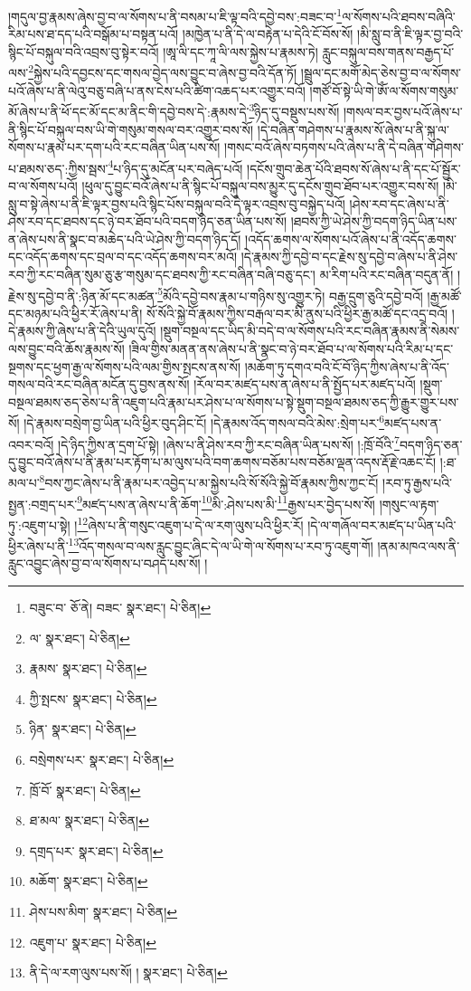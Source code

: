།གདུལ་བྱ་རྣམས་ཞེས་བྱ་བ་ལ་སོགས་པ་ནི་བསམ་པ་ཇི་ལྟ་བའི་དབྱེ་བས་:བཟང་བ་\footnote{བཟུང་བ་  ཅོ་ནེ། བཟང་  སྣར་ཐང་།  པེ་ཅིན། }ལ་སོགས་པའི་ཐབས་བཞིའི་རིམ་པས་ཐ་དད་པའི་བསྒོམ་པ་བསྟན་པའོ། །མཁྱེན་པ་ནི་དེ་ལ་བརྟེན་པ་དེའི་ངོ་བོས་སོ། །མི་སླུ་བ་ནི་ཇི་ལྟར་བྱ་བའི་སྙིང་པོ་བསྐུལ་བའི་འབྲས་བུ་སྟེར་བའོ། །ཨཱ་ལི་དང་ཀཱ་ལི་ལས་སྐྱེས་པ་རྣམས་ཏེ། རླུང་བསྐུལ་བས་གནས་བརྒྱད་པོ་ལས་\footnote{ལ་  སྣར་ཐང་།  པེ་ཅིན། }སྐྱེས་པའི་དབྱངས་དང་གསལ་བྱེད་ལས་བྱུང་བ་ཞེས་བྱ་བའི་དོན་ཏོ། །སྦྲུལ་དང་མགོ་མེད་ཅེས་བྱ་བ་ལ་སོགས་པའོ་ཞེས་པ་ནི་ལེའུ་བཅུ་བཞི་པ་ནས་ངེས་པའི་ཚིག་འཆད་པར་འགྱུར་བའོ། །གཙོ་བོ་སྟེ་ཡི་གེ་ཨོཾ་ལ་སོགས་གསུམ་མོ་ཞེས་པ་ནི་ཕོ་དང་མོ་དང་མ་ནིང་གི་དབྱེ་བས་དེ་:རྣམས་དེ་\footnote{རྣམས་  སྣར་ཐང་།  པེ་ཅིན། }ཉིད་དུ་བསྡུས་པས་སོ། །གསལ་བར་བྱས་པའོ་ཞེས་པ་ནི་སྙིང་པོ་བསྐུལ་བས་ཡི་གེ་གསུམ་གསལ་བར་འགྱུར་བས་སོ། །དེ་བཞིན་གཤེགས་པ་རྣམས་སོ་ཞེས་པ་ནི་སྐུ་ལ་སོགས་པ་རྣམ་པར་དག་པའི་རང་བཞིན་ཡིན་པས་སོ། །གསང་བའོ་ཞེས་བཏགས་པའི་ཞེས་པ་ནི་དེ་བཞིན་གཤེགས་པ་ཐམས་ཅད་:ཀྱིས་སྦས་\footnote{ཀྱི་སྤངས་  སྣར་ཐང་།  པེ་ཅིན། }པ་ཉིད་དུ་མངོན་པར་བཞེད་པའོ། །དངོས་གྲུབ་ཆེན་པོའི་ཐབས་སོ་ཞེས་པ་ནི་དང་པོ་སྦྱོར་བ་ལ་སོགས་པའོ། །ཕུལ་དུ་བྱུང་བའོ་ཞེས་པ་ནི་སྙིང་པོ་བསྐུལ་བས་མྱུར་དུ་དངོས་གྲུབ་ཐོབ་པར་འགྱུར་བས་སོ། །མི་སླུ་བ་སྟེ་ཞེས་པ་ནི་ཇི་ལྟར་བྱས་པའི་སྙིང་པོས་བསྐུལ་བའི་དེ་ལྟར་འབྲས་བུ་བསྐྱེད་པའོ། །ཤེས་རབ་དང་ཞེས་པ་ནི་ཤེས་རབ་དང་ཐབས་དང་ཉེ་བར་ཐོབ་པའི་བདག་ཉིད་ཅན་ཡིན་པས་སོ། །ཐབས་ཀྱི་ཡེ་ཤེས་ཀྱི་བདག་ཉིད་ཡིན་པས་ན་ཞེས་པས་ནི་སྣང་བ་མཆེད་པའི་ཡེ་ཤེས་ཀྱི་བདག་ཉིད་དོ། །འདོད་ཆགས་ལ་སོགས་པའོ་ཞེས་པ་ནི་འདོད་ཆགས་དང་འདོད་ཆགས་དང་བྲལ་བ་དང་འདོད་ཆགས་བར་མའོ། །དེ་རྣམས་ཀྱི་དབྱེ་བ་དང་རྗེས་སུ་དབྱེ་བ་ཞེས་པ་ནི་ཤེས་རབ་ཀྱི་རང་བཞིན་སུམ་ཅུ་རྩ་གསུམ་དང་ཐབས་ཀྱི་རང་བཞིན་བཞི་བཅུ་དང་། མ་རིག་པའི་རང་བཞིན་བདུན་ནོ། །རྗེས་སུ་དབྱེ་བ་ནི་:ཉིན་མོ་དང་མཚན་\footnote{ཉིན་  སྣར་ཐང་།  པེ་ཅིན། }མོའི་དབྱེ་བས་རྣམ་པ་གཉིས་སུ་འགྱུར་ཏེ། བརྒྱ་དྲུག་ཅུའི་དབྱེ་བའོ། །རྒྱ་མཚོ་དང་མཉམ་པའི་ཕྱིར་རོ་ཞེས་པ་ནི། སོ་སོའི་སྐྱེ་བོ་རྣམས་ཀྱིས་བརྒལ་བར་མི་ནུས་པའི་ཕྱིར་རྒྱ་མཚོ་དང་འདྲ་བའོ། །དེ་རྣམས་ཀྱི་ཞེས་པ་ནི་དེའི་ཡུལ་དུའོ། །སྡུག་བསྔལ་དང་ཡིད་མི་བདེ་བ་ལ་སོགས་པའི་རང་བཞིན་རྣམས་ནི་སེམས་ལས་བྱུང་བའི་ཆོས་རྣམས་སོ། །ཟིལ་གྱིས་མནན་ནས་ཞེས་པ་ནི་སྣང་བ་ཉེ་བར་ཐོབ་པ་ལ་སོགས་པའི་རིམ་པ་དང་སྔགས་དང་ཕྱག་རྒྱ་ལ་སོགས་པའི་ལམ་གྱིས་སྤངས་ནས་སོ། །མཆོག་ཏུ་དགའ་བའི་ངོ་བོ་ཉིད་ཀྱིས་ཞེས་པ་ནི་འོད་གསལ་བའི་རང་བཞིན་མངོན་དུ་བྱས་ནས་སོ། །རོལ་བར་མཛད་པས་ན་ཞེས་པ་ནི་སྤྱོད་པར་མཛད་པའོ། །སྡུག་བསྔལ་ཐམས་ཅད་ཅེས་པ་ནི་འཇུག་པའི་རྣམ་པར་ཤེས་པ་ལ་སོགས་པ་སྟེ་སྡུག་བསྔལ་ཐམས་ཅད་ཀྱི་རྒྱུར་གྱུར་པས་སོ། །དེ་རྣམས་བསྲེག་བྱ་ཡིན་པའི་ཕྱིར་བུད་ཤིང་ངོ། །དེ་རྣམས་འོད་གསལ་བའི་མེས་:སྲེག་པར་\footnote{བསྲེགས་པར་  སྣར་ཐང་།  པེ་ཅིན། }མཛད་པས་ན་འབར་བའོ། །དེ་ཉིད་ཀྱིས་ན་དྲག་པོ་སྟེ། །ཞེས་པ་ནི་ཤེས་རབ་ཀྱི་རང་བཞིན་ཡིན་པས་སོ། །:ཁྲོ་བོའི་\footnote{ཁྲོ་བོ་  སྣར་ཐང་།  པེ་ཅིན། }བདག་ཉིད་ཅན་དུ་བྱུང་བའོ་ཞེས་པ་ནི་རྣམ་པར་རྟོག་པ་མ་ལུས་པའི་བག་ཆགས་བཅོམ་པས་བཅོམ་ལྡན་འདས་རྡོ་རྗེ་འཆང་ངོ། །:ཐ་མལ་པ་\footnote{ཐ་མལ་  སྣར་ཐང་།  པེ་ཅིན། }བས་ཀྱང་ཞེས་པ་ནི་རྣམ་པར་འབྱེད་པ་མ་སྐྱེས་པའི་སོ་སོའི་སྐྱེ་བོ་རྣམས་ཀྱིས་ཀྱང་ངོ། །རབ་ཏུ་རྒྱས་པའི་སྤྱན་:བགྲད་པར་\footnote{དགྲད་པར་  སྣར་ཐང་།  པེ་ཅིན། }མཛད་པས་ན་ཞེས་པ་ནི་ཆོག་\footnote{མཆོག་  སྣར་ཐང་།  པེ་ཅིན། }མི་:ཤེས་པས་མི་\footnote{ཤེས་པས་མིག་  སྣར་ཐང་།  པེ་ཅིན། }རྒྱས་པར་བྱེད་པས་སོ། །གསུང་ལ་རྟག་ཏུ་:འཇུག་པ་སྟེ། །\footnote{འཇུག་པ་  སྣར་ཐང་།  པེ་ཅིན། }ཞེས་པ་ནི་གསུང་འཇུག་པ་དེ་ལ་རག་ལུས་པའི་ཕྱིར་རོ། །དེ་ལ་གཞོལ་བར་མཛད་པ་ཡིན་པའི་ཕྱིར་ཞེས་པ་ནི་\footnote{ནི་དེ་ལ་རག་ལུས་པས་སོ། །  སྣར་ཐང་།  པེ་ཅིན། }འོད་གསལ་བ་ལས་རླུང་བྱུང་ཞིང་དེ་ལ་ཡི་གེ་ལ་སོགས་པ་རབ་ཏུ་འཇུག་གོ། །ནམ་མཁའ་ལས་ནི་རླུང་འབྱུང་ཞེས་བྱ་བ་ལ་སོགས་པ་བཤད་པས་སོ། །
